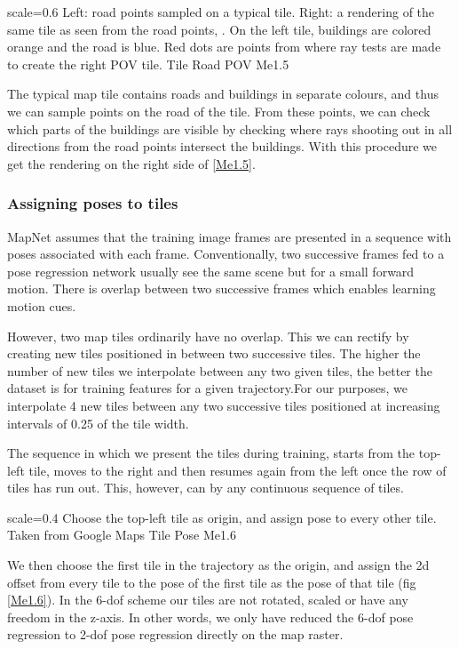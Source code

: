 {scale=0.6}%
{Left: road points sampled on a typical tile. Right: a rendering of the same tile as seen from the road points,  \cite{newman2017}. On the left tile, buildings are colored orange and the road is blue. Red dots are points from where ray tests are made to create the right POV tile.}%
{Tile Road POV}%
{Me1.5}

The typical map tile contains roads and buildings in separate colours, and thus we can sample points on the road of the tile. From these points, we can check which parts of the buildings are visible by checking where rays shooting out in all directions from the road points intersect the buildings. With this procedure we get the rendering on the right side of \ref{Me1.5}. 

\subsubsection{Assigning poses to tiles}
MapNet assumes that the training image frames are presented in a sequence with poses associated with each frame. Conventionally, two successive frames fed to a pose regression network usually see the same scene but for a small forward motion. There is overlap between two successive frames which enables learning motion cues. 

However, two map tiles ordinarily have no overlap. This we can rectify by creating new tiles positioned in between two successive tiles. The higher the number of new tiles we interpolate between any two given tiles, the better the dataset is for training features for a given trajectory.For our purposes, we interpolate 4 new tiles between any two successive tiles positioned at increasing intervals of 0.25 of the tile width. 

The sequence in which we present the tiles during training, starts from the top-left tile, moves to the right and then resumes again from the left once the row of tiles has run out. This, however, can by any continuous sequence of tiles.

{scale=0.4}%
{Choose the top-left tile as origin, and assign pose to every other tile. Taken from Google Maps}%
{Tile Pose}%
{Me1.6}

We then choose the first tile in the trajectory as the origin, and assign the 2d offset from every tile to the pose of the first tile as the pose of that tile (fig \ref{Me1.6}). In the 6-dof scheme our tiles are not rotated, scaled or have any freedom in the z-axis. In other words, we only have reduced the 6-dof pose regression to 2-dof pose regression directly on the map raster. 

